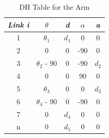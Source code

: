 \begin{table}[H]
	\begin{center}
		\begin{tabular}{|c|c|c|c|c|} 
			\hline
			\textit{Link i} & \textit{$\theta$} & \textit{d} & \textit{$\alpha$} & \textit{a}\\
			\hline
			1 & $\theta_{1}$ & $d_{1}$ & 0 & 0 \\
			2 & 0 & 0 & -90 & 0 \\
			3 & $\theta_{2}$ - 90  & 0 & -90 & $d_{2}$ \\
			4 & 0  & 0 & 90 & 0 \\ 
			5 & $\theta_{3}$ & 0 & 0 & $d_{3}$ \\
			6 & $\theta_{4}$ - 90 & 0 & -90 & 0 \\
			7 & 0 & $d_{4}$ & 0 & 0 \\
			n & 0 & $d_{5}$ & 0 & 0 \\
			\hline
		\end{tabular}
		\caption{\label{table:2} DH Table for the Arm }
	\end{center}
\end{table}

